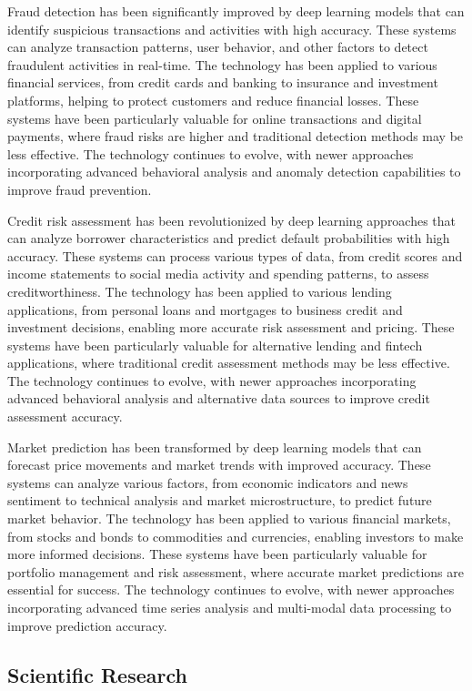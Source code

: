Fraud detection has been significantly improved by deep learning models that can identify suspicious transactions and activities with high accuracy. These systems can analyze transaction patterns, user behavior, and other factors to detect fraudulent activities in real-time. The technology has been applied to various financial services, from credit cards and banking to insurance and investment platforms, helping to protect customers and reduce financial losses. These systems have been particularly valuable for online transactions and digital payments, where fraud risks are higher and traditional detection methods may be less effective. The technology continues to evolve, with newer approaches incorporating advanced behavioral analysis and anomaly detection capabilities to improve fraud prevention.

Credit risk assessment has been revolutionized by deep learning approaches that can analyze borrower characteristics and predict default probabilities with high accuracy. These systems can process various types of data, from credit scores and income statements to social media activity and spending patterns, to assess creditworthiness. The technology has been applied to various lending applications, from personal loans and mortgages to business credit and investment decisions, enabling more accurate risk assessment and pricing. These systems have been particularly valuable for alternative lending and fintech applications, where traditional credit assessment methods may be less effective. The technology continues to evolve, with newer approaches incorporating advanced behavioral analysis and alternative data sources to improve credit assessment accuracy.

Market prediction has been transformed by deep learning models that can forecast price movements and market trends with improved accuracy. These systems can analyze various factors, from economic indicators and news sentiment to technical analysis and market microstructure, to predict future market behavior. The technology has been applied to various financial markets, from stocks and bonds to commodities and currencies, enabling investors to make more informed decisions. These systems have been particularly valuable for portfolio management and risk assessment, where accurate market predictions are essential for success. The technology continues to evolve, with newer approaches incorporating advanced time series analysis and multi-modal data processing to improve prediction accuracy.

\subsection{Scientific Research}

